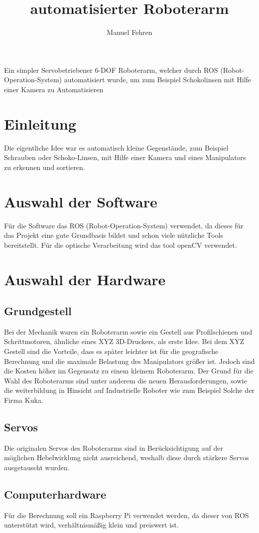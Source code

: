 \documentclass[12pt,a4paper]{article}
\author{Manuel Fehren}
\title{automatisierter Roboterarm}
\begin{document}
\maketitle
\begin{center}
Ein simpler Servobetriebener 6-DOF Roboterarm, welcher durch ROS (Robot-Operation-System) automatisiert wurde, um zum Beispiel Schokolinsen mit Hilfe einer Kamera zu Automatisieren
\end{center}
\newpage
\tableofcontents
\newpage
\section{Einleitung}
Die eigentliche Idee war es automatisch kleine Gegenstände, zum Beispiel Schrauben oder Schoko-Linsen, mit Hilfe einer Kamera und eines Manipulators zu erkennen und sortieren.
\section{Auswahl der Software}
Für die Software das ROS (Robot-Operation-System) verwendet, da dieses für das Projekt eine gute Grundbasis bildet und schon viele nützliche Tools bereitstellt.
Für die optische Verarbeitung wird das tool openCV verwendet.
\section{Auswahl der Hardware}
\subsection{Grundgestell}
Bei der Mechanik waren ein Roboterarm sowie ein Gestell aus Profilschienen und Schrittmotoren, ähnliche eines XYZ 3D-Druckers, als erste Idee.
Bei dem XYZ Gestell sind die Vorteile, dass es später leichter ist für die geografische Berechnung und die maximale Belastung des Manipulators größer ist. Jedoch sind die Kosten höher im Gegensatz zu einem kleinem Roboterarm.
Der Grund für die Wahl des Roboterarms sind unter anderem die neuen Herausforderungen, sowie die weiterbildung in Hinsicht auf Industrielle Roboter wie zum Beispiel Solche der Firma Kuka.
\subsection{Servos}
Die originalen Servos des Roboterarms sind in Berücksichtigung auf der möglichen Hebelwirklung nicht ausreichend, weshalb diese durch stärkere Servos ausgetauscht wurden.
\subsection{Computerhardware}
Für die Berechnung soll ein Raspberry Pi verwendet werden, da dieser von ROS unterstützt wird, verhältnismäßig klein und preiswert ist.
\end{document}
